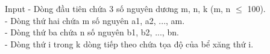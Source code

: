 Input
- Dòng đầu tiên chứa 3 số nguyên dương m, n, k (m, n  $\le$  100).   
\\   - Dòng thứ hai chứa m số nguyên a1, a2, ..., am.   
\\   - Dòng thứ ba chứa n số nguyên b1, b2, ..., bn.   
\\   - Dòng thứ i trong k dòng tiếp theo chứa tọa độ của bể xăng thứ i.
